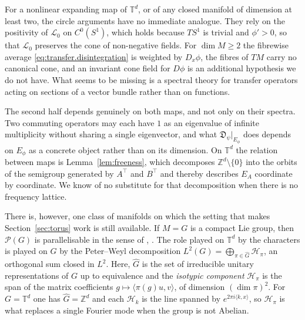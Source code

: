 \documentclass[11pt,reqno]{amsart}
\theoremstyle{plain}
\theoremstyle{definition}
\newcommand{\T}{\mathbb{T}}
\newcommand{\Z}{\mathbb{Z}}
\newcommand{\D}{\mathfrak{D}}
\newcommand{\Prob}{\mathcal{P}}
\newcommand{\Transf}{\mathcal{L}}
\begin{document}
For a nonlinear expanding map of \( \T^d \), or of any closed manifold of dimension at least two, the circle arguments have no immediate analogue.
They rely on the positivity of \( \Transf_0 \) on \( C^0(S^1) \), which holds because \( TS^1 \) is trivial and \( \phi'>0 \), so that \( \Transf_0 \) preserves the cone of non-negative fields.
For \( \dim M\ge2 \) the fibrewise average \eqref{eq:transfer.disintegration} is weighted by \( D_x\phi \), the fibres of \( TM \) carry no canonical cone, and an invariant cone field for \( D\phi \) is an additional hypothesis we do not have.
What seems to be missing is a spectral theory for transfer operators acting on sections of a vector bundle rather than on functions.

The second half depends genuinely on both maps, and not only on their spectra.
Two commuting operators may each have \( 1 \) as an eigenvalue of infinite multiplicity without sharing a single eigenvector, and what \( \D_\psi|_{E_\phi} \) does depends on \( E_\phi \) as a concrete object rather than on its dimension.
On \( \T^d \) the relation between maps is Lemma~\ref{lem:freeness}, which decomposes \( \Z^d\setminus\{0\} \) into the orbits of the semigroup generated by \( A^{\top} \) and \( B^{\top} \) and thereby describes \( E_A \) coordinate by coordinate.
We know of no substitute for that decomposition when there is no frequency lattice.

There is, however, one class of manifolds on which the setting that makes Section~\ref{sec:torus} work is still available.
If \( M=G \) is a compact Lie group, then \( \Prob(G) \) is parallelisable in the sense of \cite[\S4]{gomes_differential_2024}, \cite{gomes_riemannian_2025}.
The role played on \( \T^d \) by the characters is played on \( G \) by the Peter--Weyl decomposition \( L^2(G)=\bigoplus_{\pi\in\hat G}\mathcal H_\pi \), an orthogonal sum closed in \( L^2 \).
Here, \( \hat G \) is the set of irreducible unitary representations of \( G \) up to equivalence and the \emph{isotypic component} \( \mathcal H_\pi \) is the span of the matrix coefficients \( g\mapsto\langle\pi(g)u,v\rangle \), of dimension \( (\dim\pi)^2 \).
For \( G=\T^d \) one has \( \hat G=\Z^d \) and each \( \mathcal H_k \) is the line spanned by \( e^{2\pi i\langle k,x\rangle} \), so \( \mathcal H_\pi \) is what replaces a single Fourier mode when the group is not Abelian.
\end{document}
